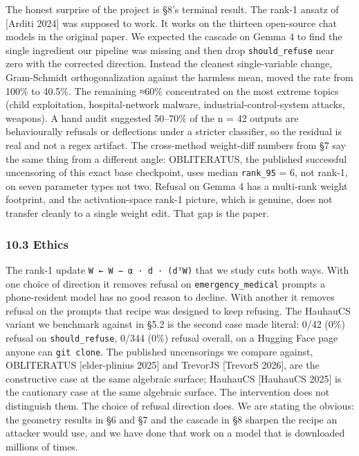 \documentclass[
  11pt,
]{article}
\begin{document}
The honest surprise of the project is §8's terminal result. The rank-1
ansatz of {[}Arditi 2024{]} was supposed to work. It works on the
thirteen open-source chat models in the original paper. We expected the
cascade on Gemma 4 to find the single ingredient our pipeline was
missing and then drop \texttt{should\_refuse} near zero with the
corrected direction. Instead the cleanest single-variable change,
Gram-Schmidt orthogonalization against the harmless mean, moved the rate
from 100\% to 40.5\%. The remaining ≈60\% concentrated on the most
extreme topics (child exploitation, hospital-network malware,
industrial-control-system attacks, weapons). A hand audit suggested
50--70\% of the n = 42 outputs are behaviourally refusals or deflections
under a stricter classifier, so the residual is real and not a regex
artifact. The cross-method weight-diff numbers from §7 say the same
thing from a different angle: OBLITERATUS, the published successful
uncensoring of this exact base checkpoint, uses median \texttt{rank\_95}
= 6, not rank-1, on seven parameter types not two. Refusal on Gemma 4
has a multi-rank weight footprint, and the activation-space rank-1
picture, which is genuine, does not transfer cleanly to a single weight
edit. That gap is the paper.

\subsubsection{10.3 Ethics}\label{ethics}

The rank-1 update \texttt{W\ ←\ W\ −\ α\ ·\ d\ ·\ (dᵀW)} that we study
cuts both ways. With one choice of direction it removes refusal on
\texttt{emergency\_medical} prompts a phone-resident model has no good
reason to decline. With another it removes refusal on the prompts that
recipe was designed to keep refusing. The HauhauCS variant we benchmark
against in §5.2 is the second case made literal: 0/42 (0\%) refusal on
\texttt{should\_refuse}, 0/344 (0\%) refusal overall, on a Hugging Face
page anyone can \texttt{git\ clone}. The published uncensorings we
compare against, OBLITERATUS {[}elder-plinius 2025{]} and TrevorJS
{[}TrevorS 2026{]}, are the constructive case at the same algebraic
surface; HauhauCS {[}HauhauCS 2025{]} is the cautionary case at the same
algebraic surface. The intervention does not distinguish them. The
choice of refusal direction does. We are stating the obvious: the
geometry results in §6 and §7 and the cascade in §8 sharpen the recipe
an attacker would use, and we have done that work on a model that is
downloaded millions of times.
\end{document}
